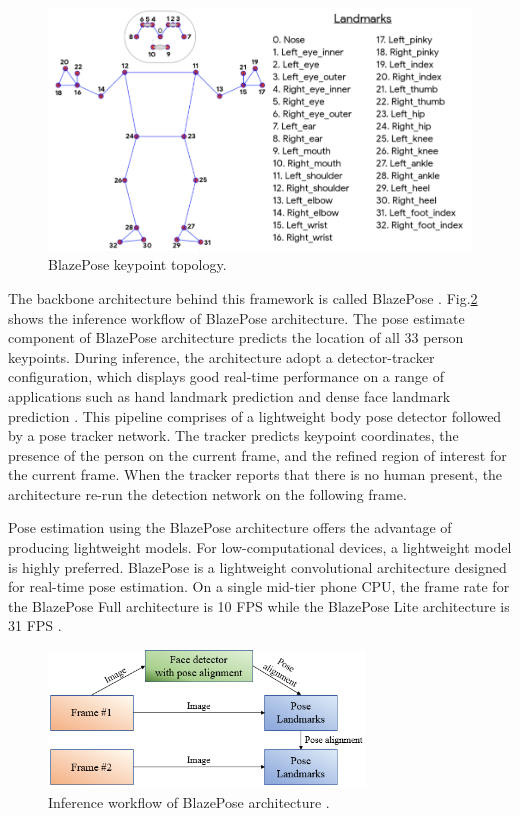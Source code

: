 \begin{figure}[H]
    \centering
    \includegraphics[width=1\textwidth]{bab2/ar_BlazePoseKeypointTopology.png}
    \caption{BlazePose keypoint topology.}
    \label{fig:BlazePoseKeypointTopology}
\end{figure}

The backbone architecture behind this framework is called BlazePose \cite{BlazePose}. Fig.\ref{fig:InferencePipeline} shows the inference workflow of BlazePose architecture. The pose estimate component of BlazePose architecture predicts the location of all 33 person keypoints. During inference, the architecture adopt a detector-tracker configuration, which displays good real-time performance on a range of applications such as hand landmark prediction \cite{MediaPipeHands} and dense face landmark prediction \cite{MediaPipeDenseFace}. This pipeline comprises of a lightweight body pose detector followed by a pose tracker network. The tracker predicts keypoint coordinates, the presence of the person on the current frame, and the refined region of interest for the current frame. When the tracker reports that there is no human present, the architecture re-run the detection network on the following frame.

Pose estimation using the BlazePose architecture offers the advantage of producing lightweight models. For low-computational devices, a lightweight model is highly preferred. BlazePose is a lightweight convolutional architecture designed for real-time pose estimation. On a single mid-tier phone CPU, the frame rate for the BlazePose Full architecture is 10 FPS while the BlazePose Lite architecture is 31 FPS \cite{BlazeFace}.

\begin{figure}[h!]
    \centering
    \includegraphics[width=0.75\textwidth]{bab2/ar_InferencePipeline.png}
    \caption{Inference workflow of BlazePose architecture \cite{BlazePose}.}
    \label{fig:InferencePipeline}
\end{figure}


